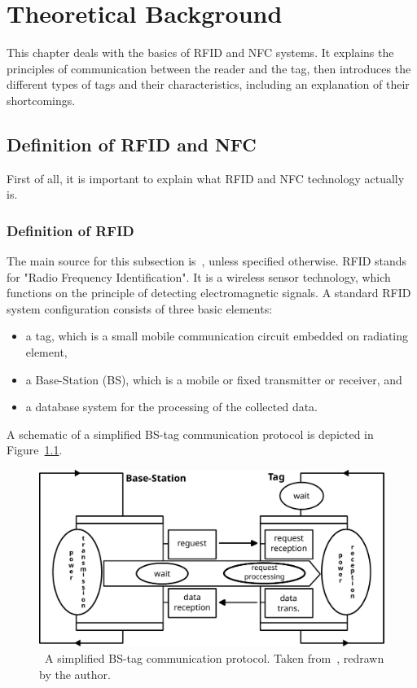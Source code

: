 \chapter{Theoretical Background}
\label{chap:theory}


This chapter deals with the basics of RFID and NFC systems. It explains the principles of communication between the reader and the tag, then introduces the different types of tags and their characteristics, including an explanation of their shortcomings.

\section{Definition of RFID and NFC}

First of all, it is important to explain what RFID and NFC technology actually is. 

\subsection{Definition of RFID}
The main source for this subsection is~\cite{tedjini2005antennas}, unless specified otherwise. RFID stands for "Radio Frequency Identification". It is a wireless sensor technology, which functions on the principle of detecting electromagnetic signals. A standard RFID system configuration consists of three basic elements: 

\begin{itemize}
    \item a tag, which is a small mobile communication circuit embedded on radiating element,
    \item a Base-Station (BS), which is a mobile or fixed transmitter or receiver, and
    \item a database system for the processing of the collected data.
\end{itemize}
A schematic of a simplified BS-tag communication protocol is depicted in Figure~\ref{fig:simplified-bs-tag-protocol}.

\begin{figure}[ht]
  \centering
  \includegraphics[width=\textwidth]{text/theoretical_background/comm_prot.pdf} %
  \caption[A simplified BS-tag communication protocol.]{~A simplified BS-tag communication protocol. Taken from~\cite{tedjini2005antennas}, redrawn by the author.}
  \label{fig:simplified-bs-tag-protocol}
\end{figure} 



